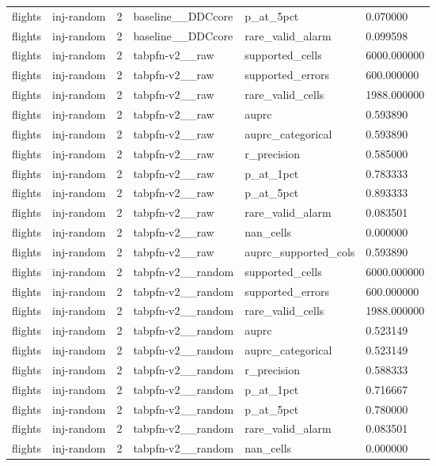 \begin{tabular}{llllll}
flights & inj-random & 2 & baseline\_\_DDCcore & p\_at\_5pct & 0.070000 \\
flights & inj-random & 2 & baseline\_\_DDCcore & rare\_valid\_alarm & 0.099598 \\
flights & inj-random & 2 & tabpfn-v2\_\_raw & supported\_cells & 6000.000000 \\
flights & inj-random & 2 & tabpfn-v2\_\_raw & supported\_errors & 600.000000 \\
flights & inj-random & 2 & tabpfn-v2\_\_raw & rare\_valid\_cells & 1988.000000 \\
flights & inj-random & 2 & tabpfn-v2\_\_raw & auprc & 0.593890 \\
flights & inj-random & 2 & tabpfn-v2\_\_raw & auprc\_categorical & 0.593890 \\
flights & inj-random & 2 & tabpfn-v2\_\_raw & r\_precision & 0.585000 \\
flights & inj-random & 2 & tabpfn-v2\_\_raw & p\_at\_1pct & 0.783333 \\
flights & inj-random & 2 & tabpfn-v2\_\_raw & p\_at\_5pct & 0.893333 \\
flights & inj-random & 2 & tabpfn-v2\_\_raw & rare\_valid\_alarm & 0.083501 \\
flights & inj-random & 2 & tabpfn-v2\_\_raw & nan\_cells & 0.000000 \\
flights & inj-random & 2 & tabpfn-v2\_\_raw & auprc\_supported\_cols & 0.593890 \\
flights & inj-random & 2 & tabpfn-v2\_\_random & supported\_cells & 6000.000000 \\
flights & inj-random & 2 & tabpfn-v2\_\_random & supported\_errors & 600.000000 \\
flights & inj-random & 2 & tabpfn-v2\_\_random & rare\_valid\_cells & 1988.000000 \\
flights & inj-random & 2 & tabpfn-v2\_\_random & auprc & 0.523149 \\
flights & inj-random & 2 & tabpfn-v2\_\_random & auprc\_categorical & 0.523149 \\
flights & inj-random & 2 & tabpfn-v2\_\_random & r\_precision & 0.588333 \\
flights & inj-random & 2 & tabpfn-v2\_\_random & p\_at\_1pct & 0.716667 \\
flights & inj-random & 2 & tabpfn-v2\_\_random & p\_at\_5pct & 0.780000 \\
flights & inj-random & 2 & tabpfn-v2\_\_random & rare\_valid\_alarm & 0.083501 \\
flights & inj-random & 2 & tabpfn-v2\_\_random & nan\_cells & 0.000000 \\

\end{tabular}
